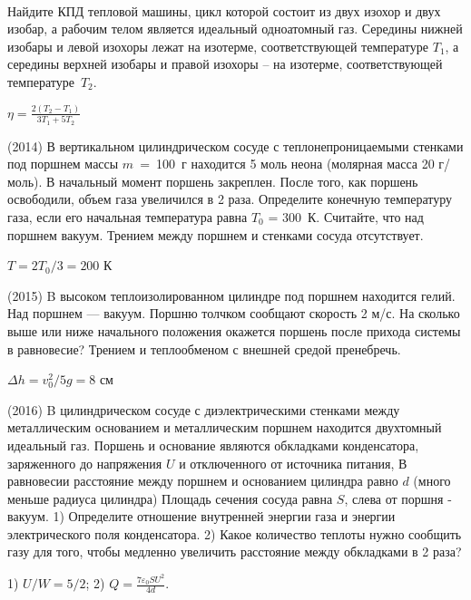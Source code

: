 \begin{ex}
\hspace{0pt} \\
\begin{minipage}{.65\textwidth}
Найдите КПД тепловой машины, цикл которой состоит из двух изохор и двух изобар, а рабочим телом является идеальный одноатомный газ. 
Середины нижней изобары и левой изохоры лежат на изотерме, соответствующей температуре $T_1$, 
а середины верхней изобары и правой изохоры -- на изотерме, соответствующей температуре~$T_2$.
\end{minipage}
\begin{minipage}{.35\textwidth}
\centering

\end{minipage}
\begin{ans}
$\eta = \frac{2(T_2-T_1)}{3T_1+5T_2}$
\end{ans}
\end{ex}

\begin{ex}
(2014) В вертикальном цилиндрическом сосуде с теплонепроницаемыми стенками под поршнем массы $m$~=~100~г находится 5 моль неона 
(молярная масса 20 г/моль). В начальный момент поршень закреплен. После того, как поршень освободили, объем газа увеличился в 2 раза. 
Определите конечную температуру газа, если его начальная температура равна $T_0$ = 300~К. Считайте, что над поршнем вакуум. 
Трением между поршнем и стенками сосуда отсутствует.
\begin{ans}
$T=2T_0/3 = 200$ К
\end{ans}
\end{ex}

\begin{ex}
(2015) B высоком теплоизолированном цилиндре под поршнем находится гелий. Над поршнем — вакуум. Поршню толчком сообщают скорость 2 м/с. На сколько выше или ниже начального положения окажется поршень после прихода системы в равновесие? Трением и теплообменом с внешней средой пренебречь.
\begin{ans}
$\Delta h = v_0^2 / 5g = 8$ см
\end{ans}
\end{ex}

\begin{ex}
(2016) B цилиндрическом сосуде с диэлектрическими стенками между металлическим основанием и металлическим поршнем находится двухтомный идеальный газ. Поршень и основание являются обкладками конденсатора, заряженного до напряжения $U$ и отключенного от источника питания, В равновесии расстояние между поршнем и основанием цилиндра равно $d$ (много меньше радиуса цилиндра) Площадь сечения сосуда равна $S$, слева от поршня - вакуум.
1) Определите отношение внутренней энергии газа и энергии электрического поля конденсатора. 2) Какое количество теплоты нужно сообщить газу для того, чтобы медленно увеличить расстояние между обкладками в 2 раза?
\begin{center}

\end{center}
\begin{ans}
1) $U/W=5/2$; 2) $Q=\frac{7\varepsilon_0 SU^2}{4d}$.
\end{ans}
\end{ex}


